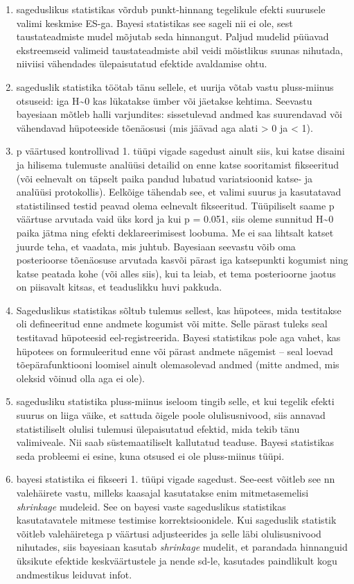 \documentclass[]{book}
\begin{document}
\begin{enumerate}
\def\labelenumi{\arabic{enumi}.}
\item
  sageduslikus statistikas võrdub punkt-hinnang tegelikule efekti suurusele valimi keskmise ES-ga. Bayesi statistikas see sageli nii ei ole, sest taustateadmiste mudel mõjutab seda hinnangut. Paljud mudelid püüavad ekstreemseid valimeid taustateadmiste abil veidi mõistlikus suunas nihutada, niiviisi vähendades ülepaisutatud efektide avaldamise ohtu.
\item
  sageduslik statistika töötab tänu sellele, et uurija võtab vastu pluss-miinus otsuseid: iga H\textasciitilde{}0 kas lükatakse ümber või jäetakse kehtima. Seevastu bayesiaan mõtleb halli varjundites: sissetulevad andmed kas suurendavad või vähendavad hüpoteeside tõenäosusi (mis jäävad aga alati \textgreater{} 0 ja \textless{} 1).
\item
  p väärtused kontrollivad 1. tüüpi vigade sagedust ainult siis, kui katse disaini ja hilisema tulemuste analüüsi detailid on enne katse sooritamist fikseeritud (või eelnevalt on täpselt paika pandud lubatud variatsioonid katse- ja analüüsi protokollis). Eelkõige tähendab see, et valimi suurus ja kasutatavad statistilinsed testid peavad olema eelnevalt fikseeritud. Tüüpiliselt saame p väärtuse arvutada vaid üks kord ja kui p = 0.051, siis oleme sunnitud H\textasciitilde{}0 paika jätma ning efekti deklareerimisest loobuma. Me ei saa lihtsalt katset juurde teha, et vaadata, mis juhtub. Bayesiaan seevastu võib oma posterioorse tõenäosuse arvutada kasvõi pärast iga katsepunkti kogumist ning katse peatada kohe (või alles siis), kui ta leiab, et tema posterioorne jaotus on piisavalt kitsas, et teaduslikku huvi pakkuda.
\item
  Sageduslikus statistikas sõltub tulemus sellest, kas hüpotees, mida testitakse oli defineeritud enne andmete kogumist või mitte. Selle pärast tuleks seal testitavad hüpoteesid eel-registreerida. Bayesi statistikas pole aga vahet, kas hüpotees on formuleeritud enne või pärast andmete nägemist -- seal loevad tõepärafunktiooni loomisel ainult olemasolevad andmed (mitte andmed, mis oleksid võinud olla aga ei ole).
\item
  sagedusliku statistika pluss-miinus iseloom tingib selle, et kui tegelik efekti suurus on liiga väike, et sattuda õigele poole olulisusnivood, siis annavad statistiliselt olulisi tulemusi ülepaisutatud efektid, mida tekib tänu valimiveale. Nii saab süstemaatiliselt kallutatud teaduse. Bayesi statistikas seda probleemi ei esine, kuna otsused ei ole pluss-miinus tüüpi.
\item
  bayesi statistika ei fikseeri 1. tüüpi vigade sagedust. See-eest võitleb see nn valehäirete vastu, milleks kaasajal kasutatakse enim mitmetasemelisi \emph{shrinkage} mudeleid. See on bayesi vaste sageduslikus statistikas kasutatavatele mitmese testimise korrektsioonidele. Kui sageduslik statistik võitleb valehäiretega p väärtusi adjusteerides ja selle läbi olulisusnivood nihutades, siis bayesiaan kasutab \emph{shrinkage} mudelit, et parandada hinnanguid üksikute efektide keskväärtustele ja nende sd-le, kasutades paindlikult kogu andmestikus leiduvat infot.
\end{enumerate}
\end{document}
